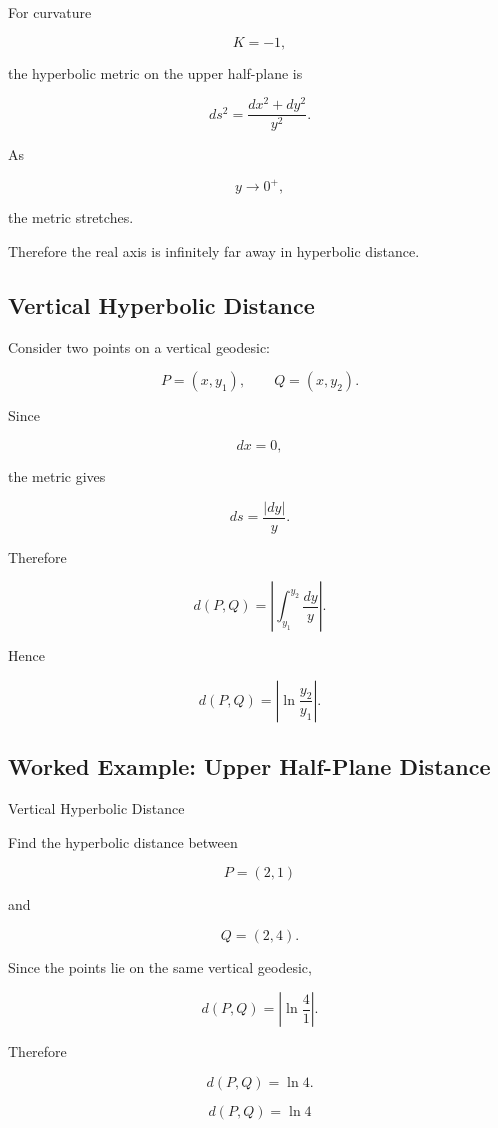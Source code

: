 For curvature

\[
K=-1,
\]

the hyperbolic metric on the upper half-plane is

\[
\boxed{
ds^2
=
\frac{dx^2+dy^2}{y^2}.
}
\]

As

\[
y\to0^{+},
\]

the metric stretches.

Therefore the real axis is infinitely far away in hyperbolic distance.

\subsection{Vertical Hyperbolic Distance}
\label{subsec:vertical-hyperbolic-distance}

Consider two points on a vertical geodesic:

\[
P=(x,y_1),
\qquad
Q=(x,y_2).
\]

Since

\[
dx=0,
\]

the metric gives

\[
ds=\frac{|dy|}{y}.
\]

Therefore

\[
d(P,Q)
=
\left|
\int_{y_1}^{y_2}\frac{dy}{y}
\right|.
\]

Hence

\[
\boxed{
d(P,Q)
=
\left|
\ln\frac{y_2}{y_1}
\right|.
}
\]

\subsection{Worked Example: Upper Half-Plane Distance}
\label{subsec:worked-upper-half-plane-distance}

\begin{workedexamplebox}{Vertical Hyperbolic Distance}

Find the hyperbolic distance between

\[
P=(2,1)
\]

and

\[
Q=(2,4).
\]

Since the points lie on the same vertical geodesic,

\[
d(P,Q)
=
\left|
\ln\frac{4}{1}
\right|.
\]

Therefore

\[
\boxed{d(P,Q)=\ln4.}
\]

\begin{answerbox}
\[
\boxed{d(P,Q)=\ln4}
\]
\end{answerbox}
\end{workedexamplebox}

